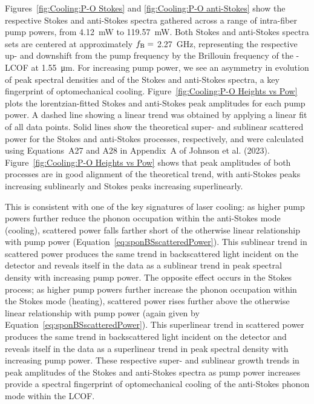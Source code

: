 Figures~\ref{fig:Cooling:P-O Stokes} and \ref{fig:Cooling:P-O anti-Stokes} show the respective Stokes and anti-Stokes spectra gathered across a range of intra-fiber pump powers, from \SI{4.12}{\milli\watt} to \SI{119.57}{\milli\watt}. Both Stokes and anti-Stokes spectra sets are centered at approximately \(f_{\rm B} = \) \SI{2.27}{\giga\hertz}, representing the respective up- and downshift from the pump frequency by the Brillouin frequency of the -\ac{LCOF} at \SI{1.55}{\micro\meter}. For increasing pump power, we see an asymmetry in evolution of peak spectral densities and of the Stokes and anti-Stokes spectra, a key fingerprint of optomechanical cooling. Figure~\ref{fig:Cooling:P-O Heights vs Pow} plots the lorentzian-fitted Stokes and anti-Stokes peak amplitudes for each pump power. A dashed line showing a linear trend was obtained by applying a linear fit of all data points. Solid lines show the theoretical super- and sublinear scattered power for the Stokes and anti-Stokes processes, respectively, and were calculated using Equations~A27 and A28 in Appendix~A of Johnson et al. (2023)\cite{johnson2023laser}. Figure~\ref{fig:Cooling:P-O Heights vs Pow} shows that peak amplitudes of both processes are in good alignment of the theoretical trend, with anti-Stokes peaks increasing sublinearly and Stokes peaks increasing superlinearly.

This is consistent with one of the key signatures of laser cooling: as higher pump powers further reduce the phonon occupation within the anti-Stokes mode (cooling), scattered power falls farther short of the otherwise linear relationship with pump power (Equation~\ref{eq:sponBSscatteredPower}). This sublinear trend in scattered power produces the same trend in backscattered light incident on the detector and reveals itself in the data as a sublinear trend in peak spectral density with increasing pump power. The opposite effect occurs in the Stokes process; as higher pump powers further increase the phonon occupation within the Stokes mode (heating), scattered power rises further above the otherwise linear relationship with pump power (again given by Equation~\ref{eq:sponBSscatteredPower}). This superlinear trend in scattered power produces the same trend in backscattered light incident on the detector and reveals itself in the data as a superlinear trend in peak spectral density with increasing pump power. These respective super- and sublinear growth trends in peak amplitudes of the Stokes and anti-Stokes spectra as pump power increases provide a spectral fingerprint of optomechanical cooling of the anti-Stokes phonon mode within the \ac{LCOF}.

